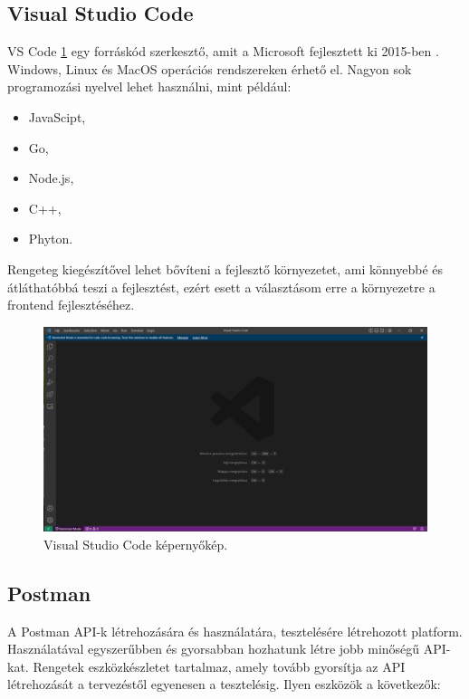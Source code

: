 \subsection{Visual Studio Code}

VS Code \ref{fig:VSCode} egy forráskód szerkesztő, amit a Microsoft fejlesztett ki 2015-ben \cite{VSCode}. Windows, Linux és MacOS operációs rendszereken érhető el. Nagyon sok programozási nyelvel lehet használni, mint például:

\begin{itemize}
\item JavaScipt,
\item Go,
\item Node.js,
\item C++,
\item Phyton.
\end{itemize}

Rengeteg kiegészítővel lehet bővíteni a fejlesztő környezetet, ami könnyebbé és átláthatóbbá teszi a fejlesztést, ezért esett a választásom erre a környezetre a frontend fejlesztéséhez.

\begin{figure}[h]
\centering
\includegraphics[scale=0.6]{images/VSCode.png}
\caption{Visual Studio Code képernyőkép.}
\label{fig:VSCode}
\end{figure}
\newpage

\subsection{Postman}

A Postman \cite{Postman} API-k létrehozására és használatára, tesztelésére létrehozott platform. Használatával egyszerűbben és gyorsabban hozhatunk létre jobb minőségű API-kat. Rengetek eszközkészletet tartalmaz, amely tovább gyorsítja az API létrehozását a  tervezéstől egyenesen a tesztelésig. Ilyen eszközök a következők:

